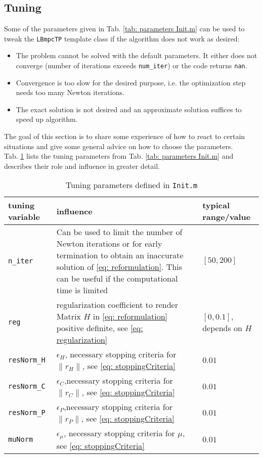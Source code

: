 \documentclass[letter]{article}
\begin{document}
\begin{sffamily}
\section{Tuning}
Some of the parameters given in Tab. \ref{tab: parameters Init.m} can be used to tweak the \texttt{LBmpcTP} template class if the algorithm does not work as desired:
\begin{itemize}
	\item The problem cannot be solved with the default parameters. It either does not converge (number of iterations exceeds \texttt{num\_iter}) or the code returns \texttt{nan}.
	\item Convergence is too slow for the desired purpose, i.e. the optimization step needs too many Newton iterations.
	\item The exact solution is not desired and an approximate solution suffices to speed up algorithm.
\end{itemize}
The goal of this section is to share some experience of how to react to certain situations and give some general advice on how to choose the parameters.\\

\noindent
Tab. \ref{tab: tuning parameters} lists the tuning parameters from Tab. \ref{tab: parameters Init.m} and describes their role and influence in greater detail.

\begin{table}[!htdp]
\caption{Tuning parameters defined in \texttt{Init.m}}
\begin{center}
\begin{tabular}{|p{3.5cm}|p{10cm}|p{3cm}|}\hline
{
	\bf tuning variable} & influence & typical range/value \\ \hline\hline

  \texttt{n\_iter} & Can be used to limit the number of Newton iterations or for early termination to  obtain an inaccurate solution of \eqref{eq: reformulation}. This can be useful if the computational time is limited & $[50,200]$ \\ \hline
 \texttt{reg} & regularization coefficient to render Matrix $H$ in \eqref{eq: reformulation} positive definite, see \eqref{eq: regularization}  & $[0,0.1]$, depends on $H$ \\ \hline
 \texttt{resNorm\_H} & $\epsilon_H$, necessary stopping criteria for $\|r_H\|$, see \eqref{eq: stoppingCriteria} & $0.01$ \\ \hline
 \texttt{resNorm\_C} & $\epsilon_C$,necessary stopping criteria for $\|r_C\|$, see \eqref{eq: stoppingCriteria} & $0.01$ \\ \hline
 \texttt{resNorm\_P} & $\epsilon_P$,necessary stopping criteria for $\|r_P\|$, see \eqref{eq: stoppingCriteria} & $0.01$ \\ \hline
 \texttt{muNorm} & $\epsilon_\mu$, necessary stopping criteria for $\mu$, see \eqref{eq: stoppingCriteria} & $0.01$ \\ \hline
\end{tabular}
\end{center}
\label{tab: tuning parameters}
\end{table}



\end{sffamily}
\end{document}

